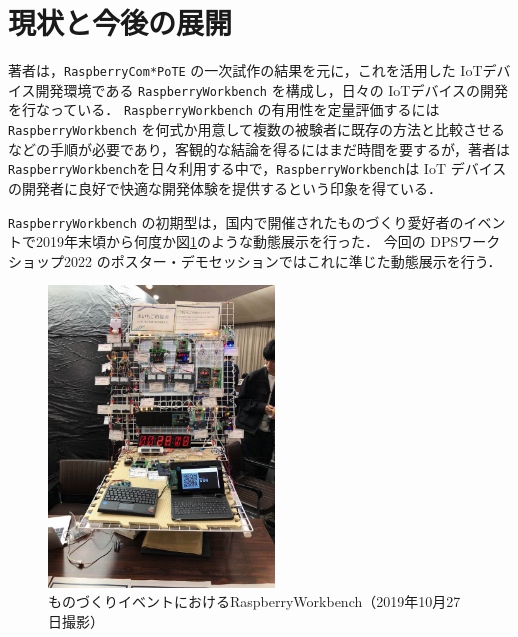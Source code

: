 
\section{現状と今後の展開}

\label{sec:07nextstep}

著者は，{\tt Raspberry\-Com*PoTE} の一次試作の結果を元に，これを活用した IoTデバイス開発環境である {\tt Raspberry\-Workbench} を構成し，日々の IoTデバイスの開発を行なっている．
{\tt Raspberry\-Workbench} の有用性を定量評価するには{\tt Raspberry\-Workbench} を何式か用意して複数の被験者に既存の方法と比較させるなどの手順が必要であり，客観的な結論を得るにはまだ時間を要するが，著者は {\tt Raspberry\-Workbench}を日々利用する中で，{\tt Raspberry\-Workbench}は IoT デバイスの開発者に良好で快適な開発体験を提供するという印象を得ている．

{\tt Raspberry\-Workbench} の初期型は，国内で開催されたものづくり愛好者のイベントで2019年末頃から何度か図\ref{RaspberryWorkbench}のような動態展示を行った．
今回の DPSワークショップ2022 のポスター・デモセッションではこれに準じた動態展示を行う．

\begin{figure}[h]
\centering
\includegraphics[width=6cm]{figspics/RaspberryWorkbench2.png}
\caption{ものづくりイベントにおける{RaspberryWorkbench}（2019年10月27日撮影）}
\label{RaspberryWorkbench}
\end{figure}



